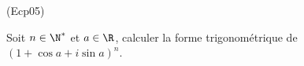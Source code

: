 \begin{tiny}(Ecp05)\end{tiny}
Soit $n\in \N^*$ et $a\in \R$, calculer la forme trigonom{\'e}trique de $(1+\cos a+i\sin a)^{n}$.